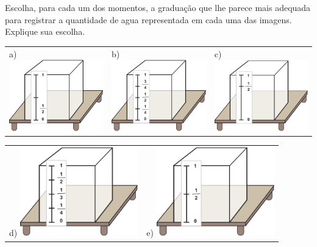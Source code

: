 Escolha, para cada um dos momentos, a graduação que lhe parece mais adequada para registrar a quantidade de agua representada em cada uma das imagens. Explique sua escolha.

  
     \begin{center}
     \begin{tabular}{m{}m{}m{}}
 \parbox[b][.3cm][t]{.3cm}{a)}  \includegraphics[width=145pt, keepaspectratio]{..//media/cap3/secoes/png/ativ1_fig05.png} &  
 \parbox[b][.3cm][t]{.3cm}{b)}  \includegraphics[width=145pt, keepaspectratio]{..//media/cap3/secoes/png/ativ1_fig06.png} &
  \parbox[b][.3cm][t]{.3cm}{c)}  \includegraphics[width=145pt, keepaspectratio]{..//media/cap3/secoes/png/ativ1_fig07.png}  
   \end{tabular}
   
  \begin{tabular}{m{}m{}}
  \parbox[b][0.3cm][t]{.3cm}{d)}  \includegraphics[width=145pt, keepaspectratio]{..//media/cap3/secoes/png/ativ1_fig08.png}&
  \parbox[b][0.3cm][t]{.3cm}{e)}  \includegraphics[width=145pt, keepaspectratio]{..//media/cap3/secoes/png/ativ1_fig09.png}
  \end{tabular}
  \end{center}

